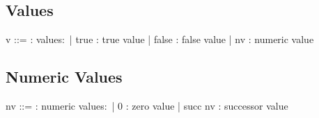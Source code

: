\subsection{Values}

\begin{bnfgrammar}
    v ::= : values$\colon$
    | true : true value
    | false : false value
    | nv : numeric value
\end{bnfgrammar}

\subsection{Numeric Values}

\begin{bnfgrammar}
    nv ::= : numeric values$\colon$
    | 0 : zero value
    | succ nv : successor value
\end{bnfgrammar}
